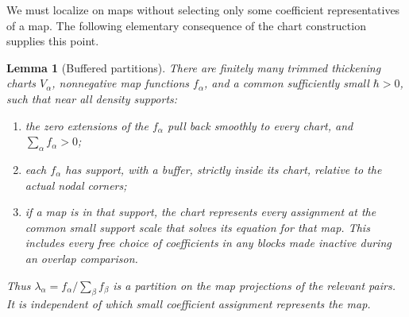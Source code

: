 \documentclass[11pt]{article}
\newtheorem{lemma}[theorem]{Lemma}
\theoremstyle{definition}
\theoremstyle{remark}
\numberwithin{equation}{section}
\begin{document}
We must localize on maps without selecting only some coefficient
representatives of a map.  The following elementary consequence of the
chart construction supplies this point.

\begin{lemma}[Buffered partitions]\label{virt:buffered-partitions}
There are finitely many trimmed thickening charts $V_\alpha$, nonnegative
map functions $f_\alpha$, and a common sufficiently small $\hbar>0$,
such that near all density supports:
\begin{enumerate}[label=\textup{(\roman*)}]
\item the zero extensions of the $f_\alpha$ pull back smoothly to every
chart, and $\sum_\alpha f_\alpha>0$;
\item each $f_\alpha$ has support, with a buffer, strictly inside its
chart, relative to the actual nodal corners;
\item if a map is in that support, the chart represents every assignment
at the common small support scale that solves its equation for that map.
This includes every free choice of coefficients in any blocks made
inactive during an overlap comparison.
\end{enumerate}
Thus $\lambda_\alpha=f_\alpha/\sum_\beta f_\beta$ is a partition on
the map projections of the relevant pairs.  It is independent of which
small coefficient assignment represents the map.
\end{lemma}
\end{document}
